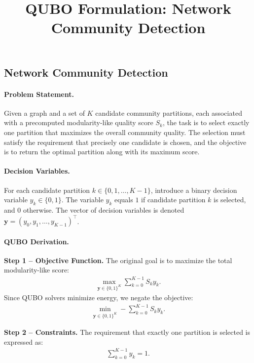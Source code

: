 \documentclass[12pt]{article}
\title{QUBO Formulation: Network Community Detection}
\date{}
\begin{document}
\maketitle

\subsection*{Network Community Detection}

\paragraph{Problem Statement.}
Given a graph and a set of $K$ candidate community partitions, each associated with a precomputed modularity-like quality score $S_k$, the task is to select exactly one partition that maximizes the overall community quality. The selection must satisfy the requirement that precisely one candidate is chosen, and the objective is to return the optimal partition along with its maximum score.

\paragraph{Decision Variables.}
For each candidate partition $k \in \{0, 1, \dots, K-1\}$, introduce a binary decision variable $y_k \in \{0,1\}$. The variable $y_k$ equals $1$ if candidate partition $k$ is selected, and $0$ otherwise. The vector of decision variables is denoted $\mathbf{y} = (y_0, y_1, \dots, y_{K-1})^\top$.

\paragraph{QUBO Derivation.}
\textbf{Step 1 -- Objective Function.} The original goal is to maximize the total modularity-like score:
\begin{align}
    \max_{\mathbf{y} \in \{0,1\}^K} \sum_{k=0}^{K-1} S_k y_k.
\end{align}
Since QUBO solvers minimize energy, we negate the objective:
\begin{align}
    \min_{\mathbf{y} \in \{0,1\}^K} -\sum_{k=0}^{K-1} S_k y_k.
\end{align}

\textbf{Step 2 -- Constraints.} The requirement that exactly one partition is selected is expressed as:
\begin{align}
    \sum_{k=0}^{K-1} y_k = 1.
\end{align}
\end{document}
